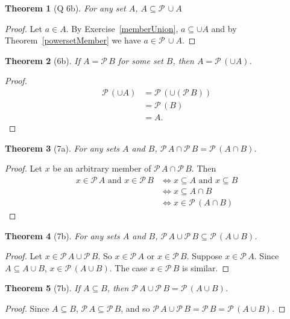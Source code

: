 \documentclass[12pt]{article}
\theoremstyle{plain}
\newtheorem*{exthm}{Theorem}
\theoremstyle{remark}
\theoremstyle{definition}
\theoremstyle{remark}
\newcommand{\powerset}{\mathscr{P}\,}
\renewcommand{\iff}{\Leftrightarrow}
\begin{document}
\begin{exthm}[Q 6b]
  For any set $A$, $A \subseteq \powerset \cup A$
\end{exthm}
\begin{proof}
  Let $a \in A$. By Exercise~\ref{memberUnion}, $a \subseteq \cup A$ and by Theorem~\ref{powersetMember} we have $a \in \powerset \cup A$.
\end{proof}

\begin{exthm}[6b]
  If $A = \powerset B$ for some set $B$, then $A = \powerset(\cup A)$.
\end{exthm}
\begin{proof}
  \begin{align*}
    \powerset(\cup A) &= \powerset(\cup (\powerset B))\\
                         &= \powerset(B)\\
                         &= A.
  \end{align*}
\end{proof}

\begin{exthm}[7a]
  For any sets $A$ and $B$, $\powerset A \cap \powerset B = \powerset (A \cap B)$.
\end{exthm}
\begin{proof}
  Let $x$ be an arbitrary member of $\powerset A \cap \powerset B$. Then
  \begin{align*}
    x \in \powerset A \text{ and } x \in \powerset B &\Leftrightarrow
    x \subseteq A \text { and } x \subseteq B\\
                                                     &\Leftrightarrow x \subseteq A \cap B\\
                                                     &\iff x \in \powerset (A \cap B)
  \end{align*}
\end{proof}

\begin{exthm}[7b]
  For any sets $A$ and $B$, $\powerset A \cup \powerset B \subseteq \powerset(A \cup B)$.
\end{exthm}
\begin{proof}
  Let $x \in \powerset A \cup \powerset B$. So $x \in \powerset A$ or $x \in \powerset B$. Suppose $x \in \powerset A$. Since $A \subseteq A \cup B$, $x \in \powerset (A \cup B)$. The case $x \in \powerset B$ is similar.
\end{proof}

\begin{exthm}[7b]
  If $A \subseteq B$, then $\powerset A \cup \powerset B = \powerset(A \cup B)$.
\end{exthm}
\begin{proof}
  Since $A \subseteq B$, $\powerset A \subseteq \powerset B$, and so $\powerset A \cup \powerset B = \powerset B = \powerset (A \cup B)$.
\end{proof}
\end{document}
